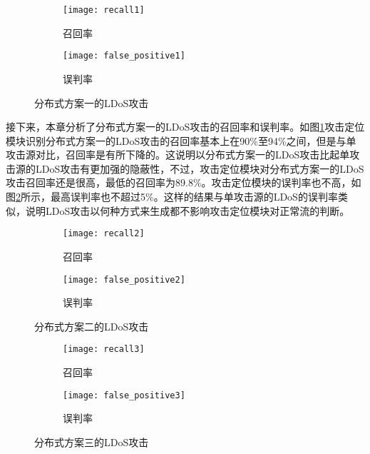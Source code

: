 \begin{figure}
    \begin{subfigure}{.49\textwidth}
        \centering
        \texttt{[image: recall1]}
        \caption{召回率}
        \label{fig:recall1}
    \end{subfigure}
    \begin{subfigure}{.49\textwidth}
        \centering
        \texttt{[image: false\_positive1]}
        \caption{误判率}
        \label{fig:false-positive1}
    \end{subfigure}
    \caption{分布式方案一的LDoS攻击}
    \label{fig:accuracy-2h-mod1}
\end{figure}

接下来，本章分析了分布式方案一的LDoS攻击的召回率和误判率。如图\ref{fig:recall1}攻击定位模块识别分布式方案一的LDoS攻击的召回率基本上在90\%至94\%之间，但是与单攻击源对比，召回率是有所下降的。这说明以分布式方案一的LDoS攻击比起单攻击源的LDoS攻击有更加强的隐蔽性，不过，攻击定位模块对分布式方案一的LDoS攻击召回率还是很高，最低的召回率为89.8\%。攻击定位模块的误判率也不高，如图\ref{fig:false-positive1}所示，最高误判率也不超过5\%。这样的结果与单攻击源的LDoS的误判率类似，说明LDoS攻击以何种方式来生成都不影响攻击定位模块对正常流的判断。

\begin{figure}
    \begin{subfigure}{.49\textwidth}
        \centering
        \texttt{[image: recall2]}
        \caption{召回率}
        \label{fig:recall2}
    \end{subfigure}
    \begin{subfigure}{.49\textwidth}
        \centering
        \texttt{[image: false\_positive2]}
        \caption{误判率}
        \label{fig:false-positive2}
    \end{subfigure}
    \caption{分布式方案二的LDoS攻击}
    \label{fig:accuracy-2h-mod2}
\end{figure}

\begin{figure}
    \begin{subfigure}{.49\textwidth}
        \centering
        \texttt{[image: recall3]}
        \caption{召回率}
        \label{fig:recall3}
    \end{subfigure}
    \begin{subfigure}{.49\textwidth}
        \centering
        \texttt{[image: false\_positive3]}
        \caption{误判率}
        \label{fig:false-positive3}
    \end{subfigure}
    \caption{分布式方案三的LDoS攻击}
    \label{fig:accuracy-2h-mod3}
\end{figure}

